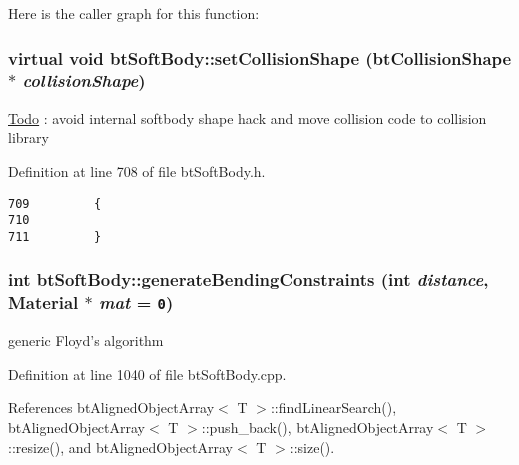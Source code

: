 Here is the caller graph for this function:\hypertarget{classbt_soft_body_ced0f5421eeb1491a3fd77bb91e2e5af}{
\subsubsection[setCollisionShape]{\setlength{\rightskip}{0pt plus 5cm}virtual void btSoftBody::setCollisionShape (btCollisionShape $\ast$ {\em collisionShape})}}
\label{classbt_soft_body_ced0f5421eeb1491a3fd77bb91e2e5af}


\begin{Desc}
\item[\hyperlink{todo__todo000039}{Todo}]: avoid internal softbody shape hack and move collision code to collision library \end{Desc}


Definition at line 708 of file btSoftBody.h.

\begin{Code}\begin{verbatim}709         {
710                 
711         }
\end{verbatim}
\end{Code}


\hypertarget{classbt_soft_body_f31b03f0ff5eecec1ec9eee5a7582d20}{
\subsubsection[generateBendingConstraints]{\setlength{\rightskip}{0pt plus 5cm}int btSoftBody::generateBendingConstraints (int {\em distance}, \/  Material $\ast$ {\em mat} = {\tt 0})}}
\label{classbt_soft_body_f31b03f0ff5eecec1ec9eee5a7582d20}




generic Floyd's algorithm 

Definition at line 1040 of file btSoftBody.cpp.

References btAlignedObjectArray$<$ T $>$::findLinearSearch(), btAlignedObjectArray$<$ T $>$::push\_\-back(), btAlignedObjectArray$<$ T $>$::resize(), and btAlignedObjectArray$<$ T $>$::size().

